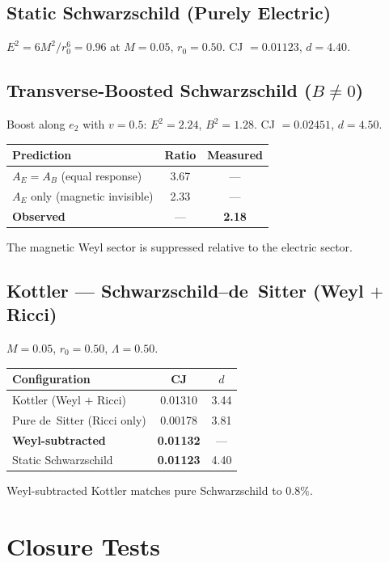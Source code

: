 \documentclass[12pt,a4paper]{article}
\begin{document}
\subsection{Static Schwarzschild (Purely Electric)}
$E^2 = 6M^2/r_0^6 = 0.96$ at $M = 0.05$, $r_0 = 0.50$. CJ $= 0.01123$, $d = 4.40$.

\subsection{Transverse-Boosted Schwarzschild ($B \neq 0$)}
Boost along $e_2$ with $v = 0.5$: $E^2 = 2.24$, $B^2 = 1.28$. CJ $= 0.02451$, $d = 4.50$.
\begin{center}
\begin{tabular}{lcc}
\toprule
Prediction & Ratio & Measured \\
\midrule
$A_E = A_B$ (equal response) & 3.67 & --- \\
$A_E$ only (magnetic invisible) & 2.33 & --- \\
\textbf{Observed} & --- & \textbf{2.18} \\
\bottomrule
\end{tabular}
\end{center}
\noindent The magnetic Weyl sector is suppressed relative to the electric sector.

\subsection{Kottler --- Schwarzschild--de~Sitter (Weyl $+$ Ricci)}
$M = 0.05$, $r_0 = 0.50$, $\Lambda = 0.50$.
\begin{center}
\begin{tabular}{lcc}
\toprule
Configuration & CJ & $d$ \\
\midrule
Kottler (Weyl $+$ Ricci) & 0.01310 & 3.44 \\
Pure de~Sitter (Ricci only) & 0.00178 & 3.81 \\
\textbf{Weyl-subtracted} & \textbf{0.01132} & --- \\
Static Schwarzschild & \textbf{0.01123} & 4.40 \\
\bottomrule
\end{tabular}
\end{center}
\noindent Weyl-subtracted Kottler matches pure Schwarzschild to $0.8\%$.

\section{Closure Tests}
\end{document}
